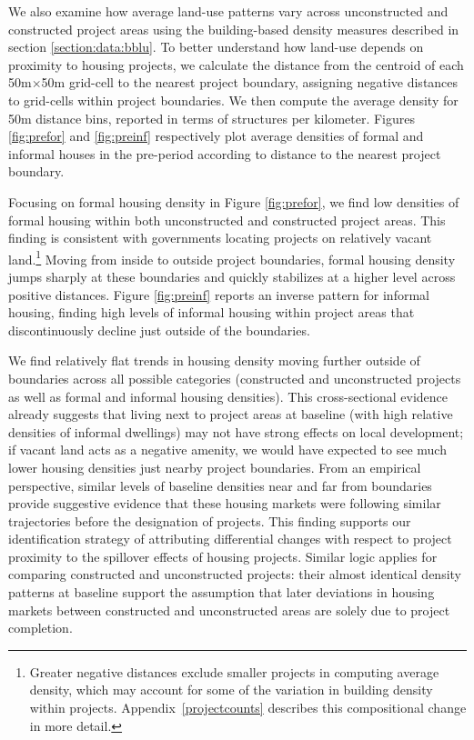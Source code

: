 \documentclass[12pt]{article}
\begin{document}
We also examine how average land-use patterns vary across unconstructed and constructed project areas using the building-based density measures described in section \ref{section:data:bblu}.  To better understand how land-use depends on proximity to housing projects, we calculate the distance from the centroid of each 50m$\times$50m grid-cell to the nearest project boundary, assigning negative distances to grid-cells within project boundaries.  We then compute the average density for 50m distance bins, reported in terms of structures per kilometer.  Figures \ref{fig:prefor} and \ref{fig:preinf} respectively plot average densities of formal and informal houses in the pre-period according to distance to the nearest project boundary.

Focusing on formal housing density in Figure \ref{fig:prefor}, we find low densities of formal housing within both unconstructed and constructed project areas. This finding is consistent with governments locating projects on relatively vacant land.\footnote{Greater negative distances exclude smaller projects in computing average density, which may account for some of the variation in building density within projects.  Appendix~\ref{projectcounts} describes this compositional change in more detail.}  Moving from inside to outside project boundaries, formal housing density jumps sharply at these boundaries and quickly stabilizes at a higher level across positive distances.  Figure \ref{fig:preinf} reports an inverse pattern for informal housing, finding high levels of informal housing within project areas that discontinuously decline just outside of the boundaries.  

We find relatively flat trends in housing density moving further outside of boundaries across all possible categories (constructed and unconstructed projects as well as formal and informal housing densities).  This cross-sectional evidence already suggests that living next to project areas at baseline (with high relative densities of informal dwellings) may not have strong effects on local development; if vacant land acts as a negative amenity, we would have expected to see much lower housing densities just nearby project boundaries.  From an empirical perspective, similar levels of baseline densities near and far from boundaries provide suggestive evidence that these housing markets were following similar trajectories before the designation of projects.  This finding supports our identification strategy of attributing differential changes with respect to project proximity to the spillover effects of housing projects.  Similar logic applies for comparing constructed and unconstructed projects: their almost identical density patterns at baseline support the assumption that later deviations in housing markets between constructed and unconstructed areas are solely due to project completion.
\end{document}
